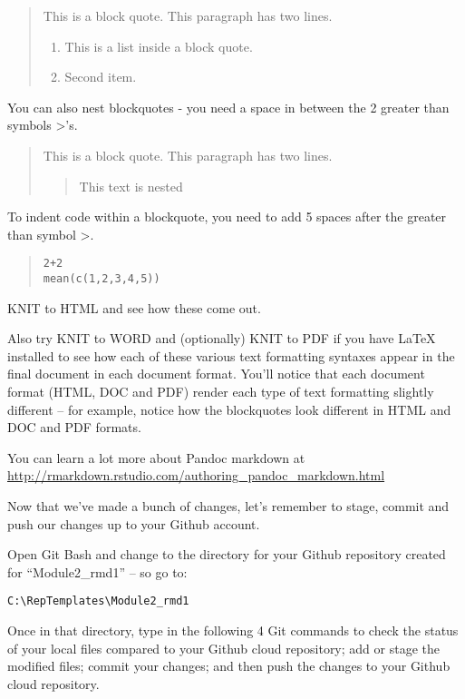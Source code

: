 \documentclass[]{book}
\providecommand{\tightlist}{%
  \setlength{\itemsep}{0pt}\setlength{\parskip}{0pt}}
\theoremstyle{definition}
\theoremstyle{definition}
\theoremstyle{definition}
\theoremstyle{remark}
\begin{document}
\begin{quote}
This is a block quote. This paragraph has two lines.

\begin{enumerate}
\def\labelenumi{\arabic{enumi}.}
\tightlist
\item
  This is a list inside a block quote.
\item
  Second item.
\end{enumerate}
\end{quote}

You can also nest blockquotes - you need a space in between the 2
greater than symbols \textgreater{}'s.

\begin{quote}
This is a block quote. This paragraph has two lines.

\begin{quote}
This text is nested
\end{quote}
\end{quote}

To indent code within a blockquote, you need to add 5 spaces after the
greater than symbol \textgreater{}.

\begin{quote}
\begin{verbatim}
2+2
mean(c(1,2,3,4,5))
\end{verbatim}
\end{quote}

KNIT to HTML and see how these come out.

Also try KNIT to WORD and (optionally) KNIT to PDF if you have LaTeX
installed to see how each of these various text formatting syntaxes
appear in the final document in each document format. You'll notice that
each document format (HTML, DOC and PDF) render each type of text
formatting slightly different -- for example, notice how the blockquotes
look different in HTML and DOC and PDF formats.

You can learn a lot more about Pandoc markdown at
\url{http://rmarkdown.rstudio.com/authoring_pandoc_markdown.html}

Now that we've made a bunch of changes, let's remember to stage, commit
and push our changes up to your Github account.

Open Git Bash and change to the directory for your Github repository
created for ``Module2\_rmd1'' -- so go to:

\texttt{C:\textbackslash{}RepTemplates\textbackslash{}Module2\_rmd1}

Once in that directory, type in the following 4 Git commands to check
the status of your local files compared to your Github cloud repository;
add or stage the modified files; commit your changes; and then push the
changes to your Github cloud repository.
\end{document}
